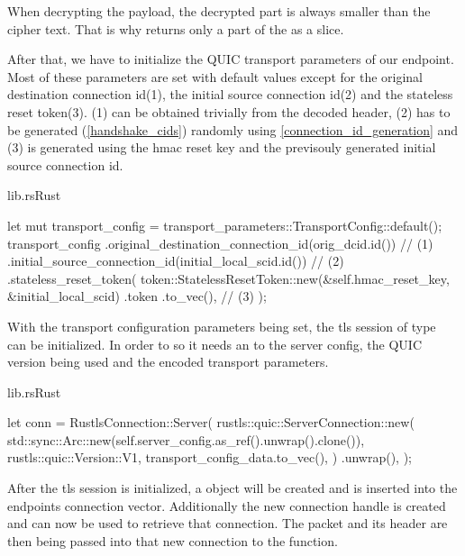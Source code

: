 When decrypting the payload, the decrypted part is always smaller than the cipher text. That is why 
returns only a part of the  as a slice. 

After that, we have to initialize the QUIC transport parameters of our endpoint. Most of these parameters are set with default values
except for the original destination connection id(1), the initial source connection id(2) and the stateless reset token(3). (1) can
be obtained trivially from the decoded header, (2) has to be generated (\ref{handshake_cids}) randomly using \ref{connection_id_generation}
and (3) is generated using the hmac reset key and the previsouly generated initial source connection id.

\begin{codeblock}{lib.rs}{Rust}
    \begin{rustcode}
        let mut transport_config = transport_parameters::TransportConfig::default();
        transport_config
            .original_destination_connection_id(orig_dcid.id()) // (1)
            .initial_source_connection_id(initial_local_scid.id()) // (2)
            .stateless_reset_token( 
                token::StatelessResetToken::new(&self.hmac_reset_key, &initial_local_scid)
                    .token
                    .to_vec(), // (3)
            );
    \end{rustcode}
\end{codeblock}

With the transport configuration parameters being set, the tls session of type \\ 
 can be initialized. In order to so it needs an  to the server config,
the QUIC version being used and the encoded transport parameters.

\begin{codeblock}{lib.rs}{Rust}
    \begin{rustcode}
        let conn = RustlsConnection::Server(
            rustls::quic::ServerConnection::new(
                std::sync::Arc::new(self.server_config.as_ref().unwrap().clone()),
                rustls::quic::Version::V1,
                transport_config_data.to_vec(),
            )
            .unwrap(),
        );
    \end{rustcode}
\end{codeblock}
        
After the tls session is initialized, a  object will be created and is inserted into the endpoints
connection vector. Additionally the new connection handle is created and can now be used to retrieve that connection. 
The packet and its header are then being passed into that new connection to the  function.


